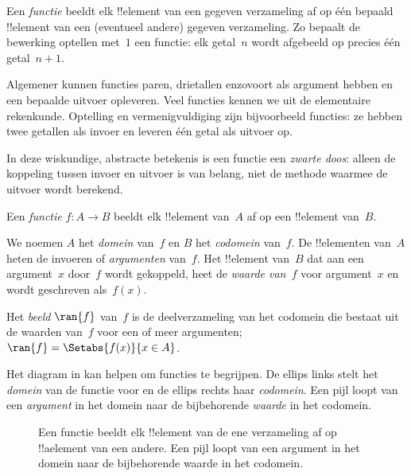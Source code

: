 \documentclass[../../../include/open-logic-section]{subfiles}
\begin{document}

\begin{explain}
Een \emph{functie} beeldt elk !!{element} van een gegeven verzameling af op
één bepaald !!{element} van een (eventueel andere) gegeven verzameling. Zo
bepaalt de bewerking optellen met~$1$ een functie:
elk getal~$n$ wordt afgebeeld op precies één getal~$n+1$.
  
Algemener kunnen functies paren, drietallen enzovoort als argument hebben en
een bepaalde uitvoer opleveren. Veel functies kennen we uit de elementaire
rekenkunde. Optelling en vermenigvuldiging zijn bijvoorbeeld functies: ze
hebben twee getallen als invoer en leveren één getal als uitvoer op.

In deze wiskundige, abstracte betekenis is een functie een \emph{zwarte
doos}: alleen de koppeling tussen invoer en uitvoer is van belang, niet de
methode waarmee de uitvoer wordt berekend.
\end{explain}

\begin{defn}[Functie]
Een \emph{functie} $f \colon A \to B$ beeldt elk !!{element} van~$A$ af
op een !!{element} van~$B$.

We noemen $A$ het \emph{domein} van~$f$ en $B$ het \emph{codomein}
van~$f$. De !!{element}en van~$A$ heten de invoeren of \emph{argumenten}
van~$f$. Het !!{element} van~$B$ dat aan een argument~$x$ door~$f$ wordt
gekoppeld, heet de \emph{waarde van~$f$} voor argument~$x$ en wordt
geschreven als~$f(x)$.

Het \emph{beeld} $\ran{f}$ van~$f$ is de deelverzameling van het codomein
die bestaat uit de waarden van~$f$ voor een of meer argumenten; $\ran{f} =
\Setabs{f(x)}{x \in A}$.
\end{defn}

Het diagram in  kan helpen om functies te begrijpen. De
ellips links stelt het \emph{domein} van de functie voor en de ellips rechts
haar \emph{codomein}. Een pijl loopt van een \emph{argument} in het domein
naar de bijbehorende \emph{waarde} in het codomein.

\begin{figure}
  \caption{Een functie beeldt elk !!{element} van de ene verzameling af op
    !!a{element} van een andere. Een pijl loopt van een argument in het
    domein naar de bijbehorende waarde in het codomein.}
\end{figure}
\end{document}
